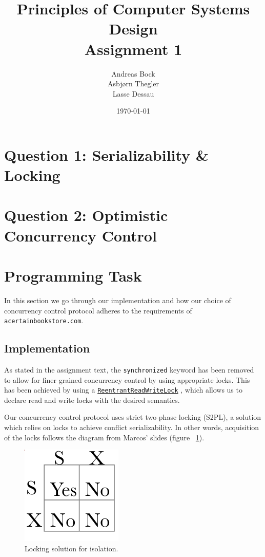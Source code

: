 \documentclass[11pt]{article}
\def\Author{Andreas Bock\\
Asbj\o rn Thegler\\
Lasse Dessau
}
\def\Title{\bf Principles of Computer Systems Design\\ {\Large Assignment 1}}
\begin{document}
\title{\Title}
\author{\Author}
\date{\today}
\maketitle

\section*{Question 1: Serializability \& Locking}

\section*{Question 2: Optimistic Concurrency Control}

\section*{Programming Task}

In this section we go through our implementation and how our choice of
concurrency control protocol adheres to the requirements of
\texttt{acertainbookstore.com}.

\subsection*{Implementation}

As stated in the assignment text, the \texttt{synchronized} keyword has
been removed to allow for finer grained concurrency control by using
appropriate locks.
This has been achieved by using a \href{http://docs.oracle.com/javase/6/docs/api/java/util/concurrent/locks/ReentrantReadWriteLock.html}{\texttt{ReentrantReadWriteLock}}  ,
which allows us to declare read and write locks with the desired semantics.

Our concurrency control protocol uses strict two-phase locking (S2PL), a solution which
relies on locks to achieve conflict serializability.
In other words, acquisition of the locks follows the diagram from Marcos'
slides (figure ~\ref{fig:lock}).\\

\begin{figure}[h!]
\begin{center}
\includegraphics[scale=0.45]{lock.png}
\caption{Locking solution for isolation.}
\label{fig:lock}
\end{center}
\end{figure}
\end{document}
